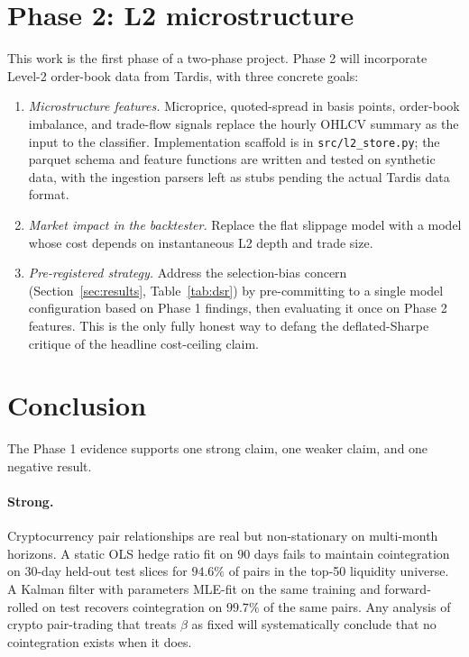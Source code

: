 \documentclass[11pt]{article}
\begin{document}
\section{Phase 2: L2 microstructure} \label{sec:phase2}

This work is the first phase of a two-phase project. Phase 2 will
incorporate Level-2 order-book data from Tardis, with three concrete
goals:

\begin{enumerate}
    \item \emph{Microstructure features.} Microprice, quoted-spread in
    basis points, order-book imbalance, and trade-flow signals replace
    the hourly OHLCV summary as the input to the classifier.
    Implementation scaffold is in \texttt{src/l2\_store.py}; the
    parquet schema and feature functions are written and tested on
    synthetic data, with the ingestion parsers left as stubs pending
    the actual Tardis data format.

    \item \emph{Market impact in the backtester.} Replace the flat
    slippage model with a model whose cost depends on instantaneous
    L2 depth and trade size.

    \item \emph{Pre-registered strategy.} Address the selection-bias
    concern (Section~\ref{sec:results}, Table~\ref{tab:dsr}) by
    pre-committing to a single model configuration based on Phase 1
    findings, then evaluating it once on Phase 2 features. This is
    the only fully honest way to defang the deflated-Sharpe critique
    of the headline cost-ceiling claim.
\end{enumerate}

\section{Conclusion}

The Phase 1 evidence supports one strong claim, one weaker claim,
and one negative result.

\paragraph{Strong.} Cryptocurrency pair relationships are real but
non-stationary on multi-month horizons. A static OLS hedge ratio fit
on $90$ days fails to maintain cointegration on $30$-day held-out
test slices for $94.6\%$ of pairs in the top-50 liquidity universe.
A Kalman filter with parameters MLE-fit on the same training and
forward-rolled on test recovers cointegration on $99.7\%$ of the
same pairs. Any analysis of crypto pair-trading that treats $\beta$
as fixed will systematically conclude that no cointegration exists
when it does.
\end{document}
